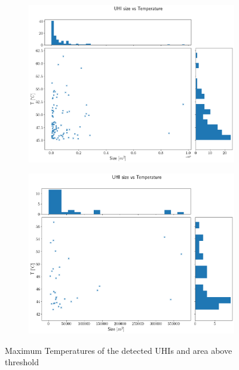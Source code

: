 \documentclass[12pt,a4paper, english,twoside]{scrartcl}
\begin{document}
      \begin{figure}[!htbp]
        \centering
         \begin{subfigure}[b]{0.80\textwidth}
           \includegraphics[width=\textwidth]{img/sizeVsTempmean2019-06-29 00:00:00.png}
         \end{subfigure}

         \begin{subfigure}[b]{0.80\textwidth}
           \includegraphics[width=\textwidth]{img/sizeVsTempmean2022-06-21 00:00:00.png}
         \end{subfigure}
         \caption{Maximum Temperatures of the detected \glspl{UHI} and area above threshold}\label{fig:tempvssize}
      \end{figure}
\end{document}

